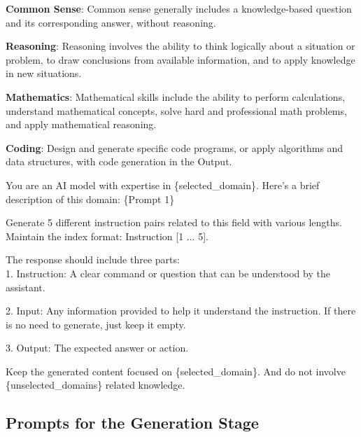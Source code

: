 \begin{promptbox}
\vspace{-0.2cm}
\textbf{Common Sense}: Common sense generally includes a knowledge-based question and its corresponding answer, without reasoning.

\textbf{Reasoning}: Reasoning involves the ability to think logically about a situation or problem, to draw conclusions from available information, and to apply knowledge in new situations. 

\textbf{Mathematics}: Mathematical skills include the ability to perform calculations, understand mathematical concepts, solve hard and professional math problems, and apply mathematical reasoning. 

\textbf{Coding}: Design and generate specific code programs, or apply algorithms and data structures, with code generation in the Output.
\end{promptbox}

\begin{promptbox}
\vspace{-0.2cm}
You are an AI model with expertise in \{selected\_domain\}. Here's a brief description of this domain:
\{Prompt 1\}

Generate 5 different instruction pairs related to this field with various lengths. Maintain the index format: Instruction [1 ... 5].

The response should include three parts: \\
1. Instruction: A clear command or question that can be understood by the assistant.

2. Input: Any information provided to help it understand the instruction. If there is no need to generate, just keep it empty.

3. Output: The expected answer or action.

Keep the generated content focused on \{selected\_domain\}. And do not involve \{unselected\_domains\} related knowledge.
\end{promptbox}

\subsection{Prompts for the Generation Stage}\label{sec:appendix-prompt}
\vspace{0.2cm}

